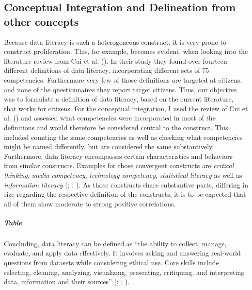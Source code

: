 \documentclass[
  12pt,
  a4paper,
  twoside]{article}
\begin{document}
\subsection{Conceptual Integration and Delineation from other concepts}\label{conceptual-integration-and-delineation-from-other-concepts}

Because data literacy is such a heterogeneous construct, it is very prone to construct proliferation. This, for example, becomes evident, when looking into the literature review from Cui et al. (). In their study they found over fourteen different definitions of data literacy, incorporating different sets of 75 competencies. Furthermore very few of those definitions are targeted at citizens, and none of the questionnaires they report target citizens.
Thus, our objective was to formulate a definition of data literacy, based on the current literature, that works for citizens. For the conceptual integration, I used the review of Cui et al. () and assessed what competencies were incorporated in most of the definitions and would therefore be considered central to the construct. This included counting the same competencies as well as checking what competencies might be named differently, but are considered the same substantively. Furthermore, data literacy encompasses certain characteristics and behaviors from similar constructs. Examples for those convergent constructs are \emph{critical thinking}, \emph{media competency}, \emph{technology competency}, \emph{statistical literacy} as well as \emph{information literacy} (; ; ). As those constructs share substantive parts, differing in size regarding the respective definition of the constructs, it is to be expected that all of them show moderate to strong positive correlations.

\subparagraph{Table}\label{table}

Concluding, data literacy can be defined as ``the ability to collect, manage, evaluate, and apply data effectively. It involves asking and answering real-world questions from datasets while considering ethical use. Core skills include selecting, cleaning, analyzing, visualizing, presenting, critiquing, and interpreting data, information and their sources'' (; ; ).
\end{document}
